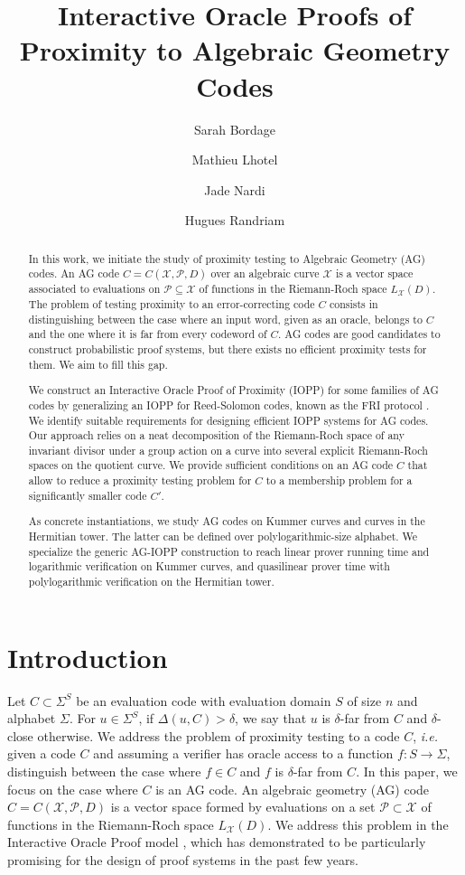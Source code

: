 \documentclass[a4paper,USenglish,autoref]{lipics-v2021}
\title{Interactive Oracle Proofs of Proximity to Algebraic Geometry Codes}
\author{Sarah {Bordage}}
{LIX, CNRS UMR 7161, Ecole Polytechnique, Institut Polytechnique de Paris \and Inria, Palaiseau, France}
{sarah.bordage@lix.polytechnique.fr}
{}
{Supported by the Chair ``Blockchain \& B2B Platforms'', led by l'\emph{X -- {\'E}cole Polytechnique} and the \emph{Fondation de l'{\'E}cole Polytechnique}, sponsored by \emph{Capgemini}, \emph{NomadicLabs} and \emph{Caisse des Dépôts}.}
\author{Mathieu {Lhotel}}
{Laboratoire de Mathématiques de Besançon, UMR 6623 CNRS, Université de Bourgogne Franche-Comté, France}
{mathieu.lhotel@univ-fcomte.fr}
{}
{}
\author{Jade {Nardi}}
{Univ Rennes, CNRS, IRMAR - UMR 6625, F-35000 Rennes, France}
{jade.nardi@univ-rennes1.fr}
{https://orcid.org/0000-0003-0901-7266}
{Suported by the French government ``Investissements d’Avenir'' program ANR-11-LABX-0020-01.}
\author{Hugues {Randriam}}
{ANSSI, Paris, France \and Institut Polytechnique de Paris, Télécom Paris, Palaiseau, France}
{randriam@telecom-paris.fr}
{}
{}
\newcommand\calX{\mathcal{X}}
\newcommand\calP{\mathcal{P}}
\begin{document}
	\nolinenumbers

\maketitle

\begin{abstract}
In this work, we initiate the study of proximity testing to Algebraic Geometry (AG) codes. An AG code $C = C(\calX, \calP, D)$ over an algebraic curve $\calX$ is a vector space associated to evaluations on $\calP \subseteq \calX$ of functions in the Riemann-Roch space $L_\calX(D)$. The problem of testing proximity to an error-correcting code $C$ consists in distinguishing between the case where an input word, given as an oracle, belongs to $C$ and the one where it is far from every codeword of $C$. AG codes are good candidates to construct probabilistic proof systems, but there exists no efficient proximity tests for them. We aim to fill this gap.

We construct an Interactive Oracle Proof of Proximity (IOPP) for some families of AG codes by generalizing an IOPP for Reed-Solomon codes, known as the \textsf{FRI} protocol \cite{BBHR18a}. We identify suitable requirements for designing efficient IOPP systems for AG codes.    
Our approach relies on a neat decomposition of the Riemann-Roch space of any invariant divisor under a group action on a curve into several explicit Riemann-Roch spaces on the quotient curve. We provide sufficient conditions on an AG code $C$ that allow to reduce a proximity testing problem for $C$ to a membership problem for a significantly smaller code $C'$.

As concrete instantiations, we study AG codes on Kummer curves and curves in the Hermitian tower. The latter can be defined over polylogarithmic-size alphabet. We specialize the generic AG-IOPP construction to reach linear prover running time and logarithmic verification on Kummer curves, and quasilinear prover time with polylogarithmic verification on the Hermitian tower.

\end{abstract}

%

\section{Introduction}
Let $C \subset \Sigma^S$ be an evaluation code with evaluation domain $S$ of size $n$ and alphabet $\Sigma$.
For $u \in \Sigma^S$, if $\Delta(u, C) > \delta$, we say that $u$ is $\delta$-far from $C$ and $\delta$-close otherwise. We address the problem of proximity testing to a code $C$, \textit{i.e.} given a code $C$ and assuming a verifier has oracle access to a function $f : S \rightarrow \Sigma$, distinguish between the case where $f \in C$ and $f$ is $\delta$-far from $C$. In this paper, we focus on the case where $C$ is an AG code. An algebraic geometry (AG) code $C = C(\calX, \calP, D)$ is a vector space formed by evaluations on a set $\calP\subset \calX$ of functions in the Riemann-Roch space $L_\calX(D)$. We address this problem in the Interactive Oracle Proof model \cite{BCS16}, which has demonstrated to be particularly promising for the design of proof systems in the past few years.
\end{document}
